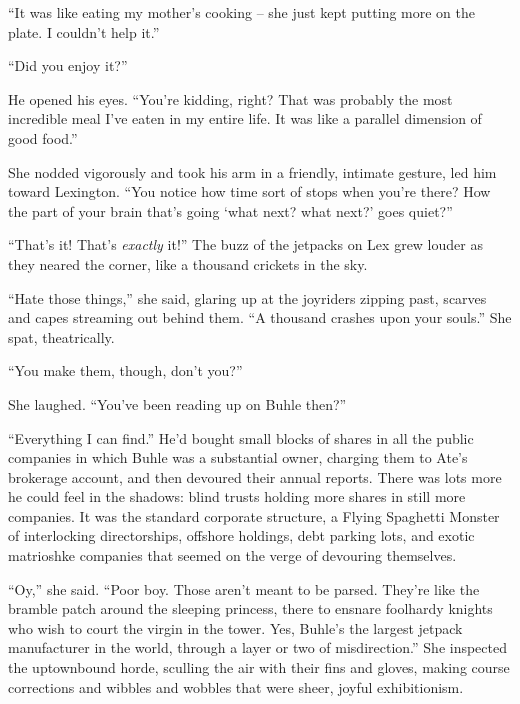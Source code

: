 “It was like eating my mother's cooking -- she just kept putting more 
on the plate. I couldn't help it.”

“Did you enjoy it?”

He opened his eyes. “You're kidding, right? That was probably the 
most incredible meal I've eaten in my entire life. It was like a 
parallel dimension of good food.”

She nodded vigorously and took his arm in a friendly, intimate gesture, 
led him toward Lexington. “You notice how time sort of stops when 
you're there? How the part of your brain that's going `what next? what 
next?' goes quiet?”

“That's it! That's \emph{exactly} it!” The buzz of the jetpacks on 
Lex grew louder as they neared the corner, like a thousand crickets in 
the sky.

“Hate those things,” she said, glaring up at the joyriders zipping 
past, scarves and capes streaming out behind them. “A thousand 
crashes upon your souls.” She spat, theatrically.

“You make them, though, don't you?”

She laughed. “You've been reading up on Buhle then?”

“Everything I can find.” He'd bought small blocks of shares in all 
the public companies in which Buhle was a substantial owner, charging 
them to Ate's brokerage account, and then devoured their annual 
reports. There was lots more he could feel in the shadows: blind trusts 
holding more shares in still more companies. It was the standard 
corporate structure, a Flying Spaghetti Monster of interlocking 
directorships, offshore holdings, debt parking lots, and exotic 
matrioshke companies that seemed on the verge of devouring themselves.

“Oy,” she said. “Poor boy. Those aren't meant to be parsed. 
They're like the bramble patch around the sleeping princess, there to 
ensnare foolhardy knights who wish to court the virgin in the tower. 
Yes, Buhle's the largest jetpack manufacturer in the world, through a 
layer or two of misdirection.” She inspected the uptownbound horde, 
sculling the air with their fins and gloves, making course corrections 
and wibbles and wobbles that were sheer, joyful exhibitionism.

